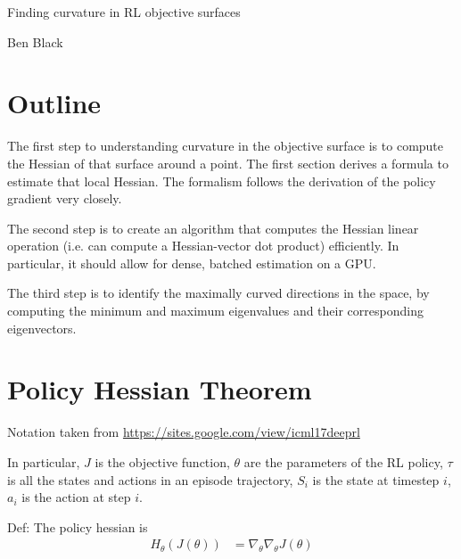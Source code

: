 \documentclass{article}
\newcommand{\shortbar}{\begin{center}\rule{5ex}{0.1pt}\end{center}}
\theoremstyle{plain}
\theoremstyle{definition}
\theoremstyle{remark}
\newenvironment{solution}[1]{\medskip\noindent{\bf Solution #1.~}}{\shortbar}
\begin{document}
	\begin{center} 
		\huge Finding curvature in RL objective surfaces
	\end{center}
	
	\begin{center} 
		\large Ben Black
	\end{center}
	
	\section{Outline}
	
	The first step to understanding curvature in the objective surface is to compute the Hessian of that surface around a point. The first section derives a formula to estimate that local Hessian. The formalism follows the derivation of the policy gradient very closely.
	
	The second step is to create an algorithm that computes the Hessian linear operation (i.e. can compute a Hessian-vector dot product) efficiently. In particular, it should allow for dense, batched estimation on a GPU.
	
	The third step is to identify the maximally curved directions in the space, by computing the minimum and maximum eigenvalues and their corresponding eigenvectors. 
	
	\section{Policy Hessian Theorem}
	

	
	Notation taken from \url{https://sites.google.com/view/icml17deeprl}
	
	In particular, $J$ is the objective function, $\theta$ are the parameters of the RL policy, $\tau$ is all the states and actions in an episode trajectory, $S_i$ is the state at timestep $i$, $a_i$ is the action at step $i$. 
	
	Def: The policy hessian is 
	$$
	\begin{aligned}
	H_\theta(J(\theta)) &= \nabla_\theta \nabla_\theta J(\theta)
	\end{aligned}
	$$
	
\end{document}
